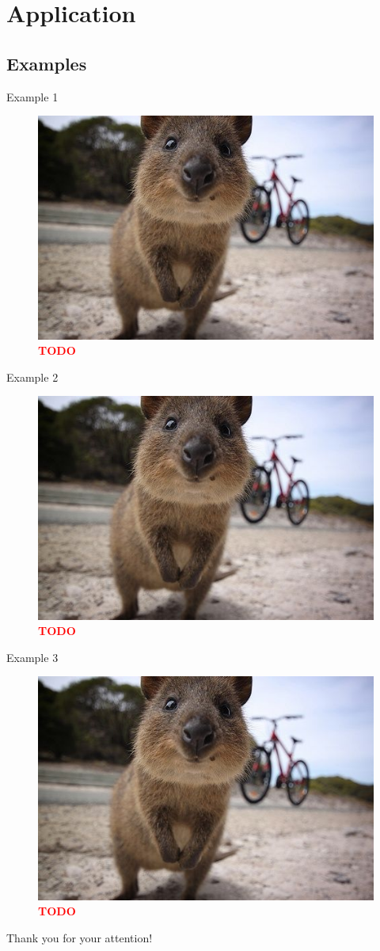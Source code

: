 \documentclass[]{beamer}
\newcommand{\TODO}{\textbf{\textcolor{red}{TODO}}} %
\begin{document}
\section[Application]{Application}

  \subsection{Examples}

    \begin{frame}{Example 1}
      \begin{figure}
        \includegraphics[width=.5\textwidth,height=.5\textheight,keepaspectratio]{img/todo.jpg}
        \caption{\TODO}
      \end{figure}
    \end{frame}

  \begin{frame}{Example 2}
      \begin{figure}
        \includegraphics[width=.5\textwidth,height=.5\textheight,keepaspectratio]{img/todo.jpg}
        \caption{\TODO}
      \end{figure}
    \end{frame}

  \begin{frame}{Example 3}
      \begin{figure}
        \includegraphics[width=.5\textwidth,height=.5\textheight,keepaspectratio]{img/todo.jpg}
        \caption{\TODO}
      \end{figure}
    \end{frame}


\begin{frame}[plain]
  \vspace{20mm}
  \centerline{Thank you for your attention!}
\end{frame}
\end{document}
